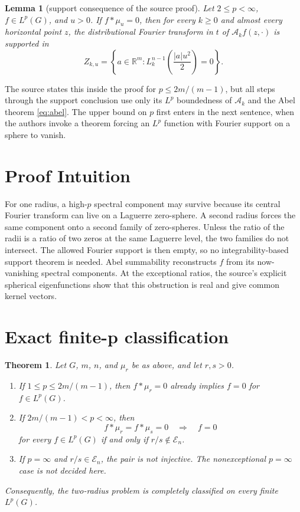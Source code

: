 \documentclass[11pt]{article}
\newtheorem{theorem}{Theorem}
\newtheorem{lemma}{Lemma}
\newcommand{\R}{\mathbb{R}}
\newcommand{\E}{\mathcal{E}}
\newcommand{\A}{\mathcal{A}}
\begin{document}
\begin{lemma}[support consequence of the source proof]\label{lem:support}
Let $2\leq p<\infty$, $f\in L^p(G)$, and $u>0$.  If
$f*\mu_u=0$, then for every $k\geq0$ and almost every horizontal point $z$,
the distributional Fourier transform in $t$ of $\A_kf(z,\cdot)$ is supported
in
\[
 Z_{k,u}=\left\{a\in\R^m:
 L_k^{n-1}\!\left(\frac{|a|u^2}{2}\right)=0\right\}.
\]
\end{lemma}

\noindent The source states this inside the proof for
$p\leq2m/(m-1)$, but all steps through the support conclusion use only its
$L^p$ boundedness of $\A_k$ and the Abel theorem \eqref{eq:abel}.  The upper
bound on $p$ first enters in the next sentence, when the authors invoke a
theorem forcing an $L^p$ function with Fourier support on a sphere to vanish.

\section{Proof Intuition}

For one radius, a high-$p$ spectral component may survive because its central
Fourier transform can live on a Laguerre zero-sphere.  A second radius forces
the same component onto a second family of zero-spheres.  Unless the ratio of
the radii is a ratio of two zeros at the same Laguerre level, the two families
do not intersect.  The allowed Fourier support is then empty, so no
integrability-based support theorem is needed.  Abel summability reconstructs
$f$ from its now-vanishing spectral components.  At the exceptional ratios,
the source's explicit spherical eigenfunctions show that this obstruction is
real and give common kernel vectors.

\section{Exact finite-p classification}

\begin{theorem}\label{thm:main}
Let $G$, $m$, $n$, and $\mu_r$ be as above, and let $r,s>0$.
\begin{enumerate}
\item If $1\leq p\leq 2m/(m-1)$, then $f*\mu_r=0$ already implies
      $f=0$ for $f\in L^p(G)$.
\item If $2m/(m-1)<p<\infty$, then
\[
 f*\mu_r=f*\mu_s=0\quad\Longrightarrow\quad f=0
\]
for every $f\in L^p(G)$ if and only if $r/s\notin\E_n$.
\item If $p=\infty$ and $r/s\in\E_n$, the pair is not injective.  The
      nonexceptional $p=\infty$ case is not decided here.
\end{enumerate}
Consequently, the two-radius problem is completely classified on every finite
$L^p(G)$.
\end{theorem}
\end{document}
